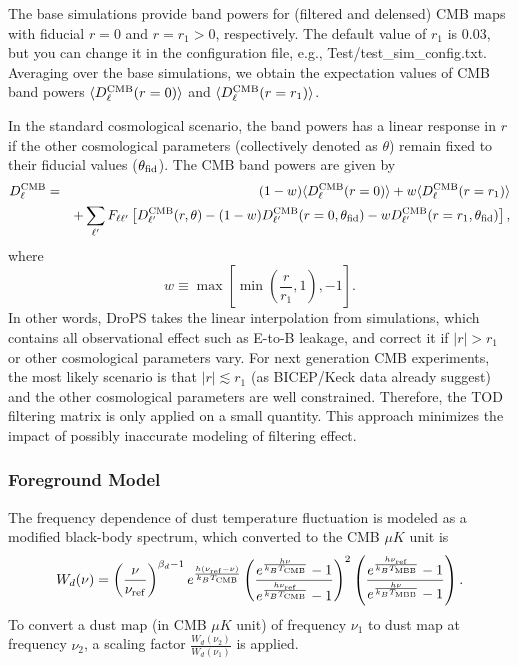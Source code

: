 \documentclass[12pt, a4paper]{ctexart} %
\begin{document}
The base simulations provide band powers for (filtered and delensed) CMB maps with fiducial $r=0$ and $r=r_1>0$, respectively. The default value of $r_1$ is $0.03$, but you can change it in the configuration file, e.g., Test/test\_sim\_config.txt. Averaging over the base simulations, we obtain the expectation values of CMB band powers $\langle D^{\rm CMB}_\ell(r=0)\rangle $ and $\langle D^{\rm CMB}_\ell(r=r_1)\rangle$.

In the standard cosmological scenario, the band powers has a linear response in $r$ if the other cosmological parameters  (collectively denoted as $\theta$) remain fixed to their fiducial values ($\theta_{\rm fid}$). The CMB band powers are given by
\begin{eqnarray}
  D^{\rm CMB}_\ell &=&  (1-w) \langle D^{\rm CMB}_\ell(r=0)\rangle  + w\langle D^{\rm CMB}_\ell(r=r_1) \rangle \\
  && +\sum_{\ell^\prime} F_{\ell \ell^\prime}\left[D^{\rm CMB}_{\ell^\prime}(r, \theta) - (1-w)D_{\ell^\prime}^{\rm CMB}(r=0, \theta_{\rm fid})- wD_{\ell^\prime }^{\rm CMB}(r=r_1, \theta_{\rm fid})\right],
\end{eqnarray}
where
\begin{equation}
  w \equiv \max\left[\min\left(\frac{r}{r_1}, 1\right), -1\right].
\end{equation}
In other words, DroPS takes the linear interpolation from simulations, which contains all observational effect such as E-to-B leakage, and correct it if $|r|>r_1$ or other cosmological parameters vary. For next generation CMB experiments, the most likely scenario is that $|r|\lesssim r_1$ (as BICEP/Keck data already suggest) and the other cosmological parameters are well constrained. Therefore, the TOD filtering matrix is only applied on a small quantity. This approach minimizes the impact of possibly inaccurate modeling of filtering effect.


\subsubsection{Foreground Model}

The frequency dependence of dust temperature fluctuation is modeled as a modified black-body spectrum, which converted to the CMB $\mu K$ unit is
\begin{equation}
  W_d(\nu) = \left(\frac{\nu}{\nu_{\rm ref}}\right)^{\beta_d-1}e^{\frac{h(\nu_{\rm ref} - \nu)}{k_BT_{\rm CMB}}}\left(\frac{e^{\frac{h\nu}{k_BT_{\rm CMB}}}-1}{e^{\frac{h\nu_{\rm ref}}{k_BT_{\rm CMB}}}-1}\right)^2 \left(\frac{e^{\frac{h\nu_{\rm ref}}{k_BT_{\rm MBB}}}-1}{e^{\frac{h\nu}{k_BT_{\rm MBB}}}-1}\right). \label{eq:dust_w}
\end{equation}
To convert a dust map (in CMB $\mu K$ unit) of frequency $\nu_1$ to dust map at frequency $\nu_2$, a scaling factor $\frac{W_d(\nu_2)}{W_d(\nu_1)}$ is applied.
\end{document}
